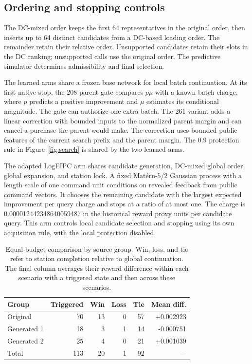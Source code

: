 \documentclass[sigconf,review,anonymous]{acmart}
\begin{document}
\subsection{Ordering and stopping controls}
The DC-mixed order keeps the first 64 representatives in the original order, then inserts up to 64 distinct candidates from a DC-based loading order. The remainder retain their relative order. Unsupported candidates retain their slots in the DC ranking; unsupported calls use the original order. The predictive simulator determines admissibility and final selection.

The learned arms share a frozen base network for local batch continuation. At its first native stop, the 208 parent gate compares \(p\mu\) with a known batch charge, where \(p\) predicts a positive improvement and \(\mu\) estimates its conditional magnitude. The gate can authorize one extra batch. The 261 variant adds a linear correction with bounded inputs to the normalized parent margin and can cancel a purchase the parent would make. The correction uses bounded public features of the current search prefix and the parent margin. The 0.9 protection rule in Figure~\ref{fig:search} is shared by the two learned arms.

The adapted LogEIPC arm shares candidate generation, DC-mixed global order, global expansion, and station lock. A fixed Matérn-5/2 Gaussian process with a length scale of one command unit conditions on revealed feedback from public command vectors. It chooses the remaining candidate with the largest expected improvement per query charge and stops at a ratio of at most one. The charge is 0.000012442348640059487 in the historical reward proxy units per candidate query. This arm controls local candidate selection and stopping using its own acquisition rule, with the local protection disabled.

\begin{table}[t]
\centering
\caption{Equal-budget comparison by source group. Win, loss, and tie refer to station completion relative to global continuation. The final column averages their reward difference within each scenario with a triggered state and then across these scenarios.}
\label{tab:budget}
\small
\begin{tabular}{@{}lrrrrr@{}}
\toprule
Group & Triggered & Win & Loss & Tie & Mean diff.\\
\midrule
Original & 70 & 13 & 0 & 57 & +0.002923\\
Generated 1 & 18 & 3 & 1 & 14 & -0.000751\\
Generated 2 & 25 & 4 & 0 & 21 & +0.001039\\
\midrule
Total & 113 & 20 & 1 & 92 & ---\\
\bottomrule
\end{tabular}
\end{table}
\end{document}
